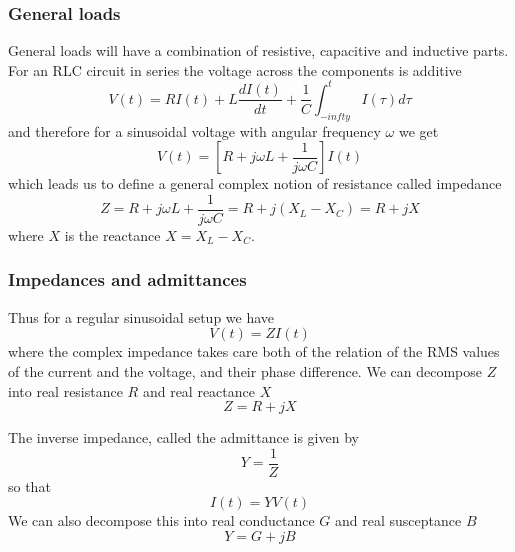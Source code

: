 \documentclass[10pt,aspectratio=169,dvipsnames]{beamer}
\begin{document}
\begin{frame}
  \frametitle{General loads}

  General loads will have a combination of resistive, capacitive and
  inductive parts. For an RLC circuit in series the voltage across the
  components is additive
  \begin{equation*}
    V(t) = R I(t) + L\frac{dI(t)}{dt} + \frac{1}{C} \int_{-infty}^t I(\tau) d\tau
  \end{equation*}
  and therefore for a sinusoidal voltage with angular frequency $\omega$ we get
  \begin{equation*}
    V(t) = \left[ R + j\omega L + \frac{1}{j\omega C} \right] I(t)
  \end{equation*}
  which leads us to define a general complex notion of resistance called \alert{impedance}
  \begin{equation*}
    Z =  R + j\omega L + \frac{1}{j\omega C} = R + j(X_L - X_C) = R + jX
  \end{equation*}
  where $X$ is the reactance $X = X_L - X_C$.
\end{frame}


\begin{frame}
  \frametitle{Impedances and admittances}

  Thus for a regular sinusoidal setup we have
  \begin{equation*}
    V(t) = ZI(t)
  \end{equation*}
  where the complex \alert{impedance} takes care both of the relation
  of the RMS values of the current and the voltage, and their phase
  difference. We can decompose $Z$ into real resistance $R$ and real reactance $X$
  \begin{equation*}
    Z = R + jX
  \end{equation*}

  The inverse impedance, called the \alert{admittance} is given by
  \begin{equation*}
    Y = \frac{1}{Z}
  \end{equation*}
  so that
  \begin{equation*}
    I(t) = Y V(t)
  \end{equation*}
  We can also decompose this into real conductance $G$ and real susceptance $B$
  \begin{equation*}
    Y = G + jB
  \end{equation*}


\end{frame}
\end{document}
